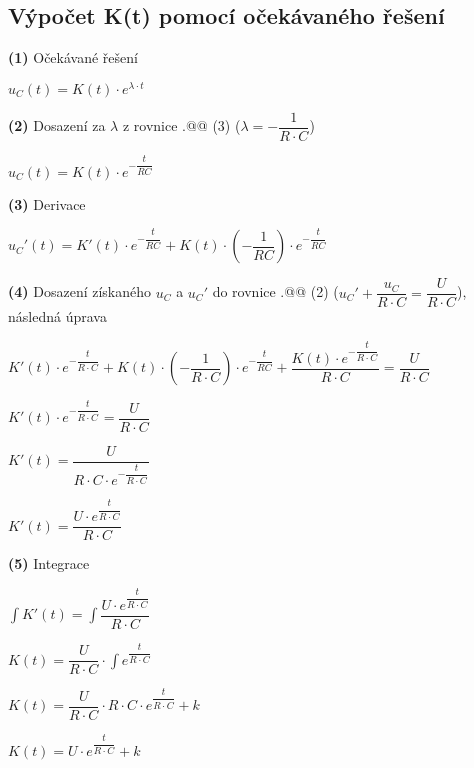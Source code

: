 \documentclass[a4paper,12pt]{article}
\makeatletter
\newcommand*{\rom}[1]{\expandafter\@slowromancap\romannumeral #1@}
\makeatother
\begin{document}
\subsection{Výpočet K(t) pomocí očekávaného řešení}
\hspace{1em}\textbf{(1)} Očekávané řešení\par\vspace{0.2em}
$u_C(t)=K(t)\cdot e^{\lambda\cdot t}$\par\vspace{1em}
\hspace{1em}\textbf{(2)} Dosazení za $\lambda$ z rovnice \rom{5.}\rom{2} (3) ($\lambda =-\dfrac{1}{R\cdot C}$)\par\vspace{0.2em}
$u_C(t)=K(t)\cdot e^{-\dfrac{t}{RC}}$\par\vspace{1em}
\hspace{1em}\textbf{(3)} Derivace\par\vspace{0.2em}
$u_C'(t)=K'(t)\cdot e^{-\dfrac{t}{RC}}+K(t)\cdot (-\dfrac{1}{RC})\cdot e^{-\dfrac{t}{RC}}$\par\vspace{1em}
\hspace{1em}\textbf{(4)} Dosazení získaného $u_C$ a $u_C'$ do rovnice \rom{5.}\rom{2} (2) ($u_C'+\dfrac{u_C}{R\cdot C}=\dfrac{U}{R\cdot C}$), následná úprava\par\vspace{0.5em}
$K'(t)\cdot e^{-\dfrac{t}{R\cdot C}}+K(t)\cdot (-\dfrac{1}{R\cdot C})\cdot e^{-\dfrac{t}{RC}}+\dfrac{K(t)\cdot e^{-\dfrac{t}{R\cdot C}}}{R\cdot C}=\dfrac{U}{R\cdot C}$\par
$K'(t)\cdot e^{-\dfrac{t}{R\cdot C}}=\dfrac{U}{R\cdot C}$\par
$K'(t)=\dfrac{U}{R\cdot C\cdot e^{-\dfrac{t}{R\cdot C}}}$\par
$K'(t)=\dfrac{U\cdot e^{\dfrac{t}{R\cdot C}}}{R\cdot C}$\par\vspace{1em}
\hspace{1em}\textbf{(5)} Integrace\par\vspace{0.2em}
$\int K'(t)=\int \dfrac{U\cdot e^{\dfrac{t}{R\cdot C}}}{R\cdot C}$\par
$K(t)=\dfrac{U}{R\cdot C}\cdot \int e^{\dfrac{t}{R\cdot C}}$\par
$K(t)=\dfrac{U}{R\cdot C}\cdot R\cdot C\cdot e^{\dfrac{t}{R\cdot C}}+k$\par
$K(t)=U\cdot e^{\dfrac{t}{R\cdot C}}+k$\newpage
\end{document}
